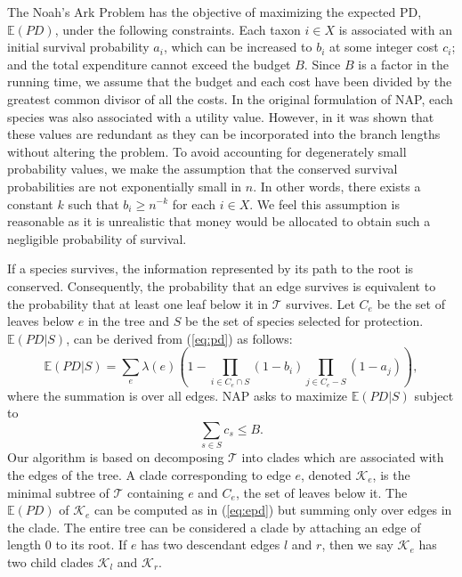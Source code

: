 \documentclass[10pt]{llncs}       \usepackage{graphicx,subfigure}
\begin{document}
The Noah's Ark Problem has the
objective of 
maximizing the expected PD, $\mathbb{E}(PD)$, under the following
constraints.  Each taxon $i \in X$ is associated with an initial survival 
probability $a_i$, which can be increased to $b_i$ at some integer cost $c_i$;
and the total expenditure cannot exceed the budget $B$.  Since $B$ is a 
factor in the running time, we assume that the budget and each cost have been
divided by the greatest common divisor of all the costs. 
In the original
formulation of NAP, each species was also associated with a utility
value. However, 
in \cite{hartmann06} it was shown that
these values are redundant as they can
be incorporated into the branch lengths without altering the problem.
To avoid accounting for degenerately small probability values, we make the
assumption that the conserved survival probabilities are not exponentially
 small in $n$. In
other words, there exists a constant $k$ such that $b_i \geq n^{-k}$ for each
$i \in X$.
We feel this assumption is reasonable as it is unrealistic that money would
be allocated to obtain such a negligible probability of survival.

If a species survives, the information represented by its path to the root
is conserved.  Consequently, the probability that an edge survives is 
equivalent to the probability that at least one leaf below it in 
$\mathcal{T}$ survives.  Let $C_e$ be the set of leaves below $e$ in the
tree and $S$ be the set of species selected for 
protection.  
$\mathbb{E}(PD|S)$, can be derived from 
(\ref{eq:pd})  as follows: 
\begin{equation}
\label{eq:epd}
\mathbb{E}(PD|S) = \sum_e \lambda(e) \left(1 - \prod_{i \in C_e \cap S}
\left(1 - b_i \right) \prod_{j \in C_e - S}
\left(1 - a_j \right) \right),
\end{equation}
where the summation is over all edges. NAP asks to maximize $\mathbb{E}(PD|S)$
subject to
\begin{equation*}
\label{eq:bugetconstraint}
\sum_{s \in S}c_s   \leq B.
\end{equation*}
Our algorithm is based on decomposing $\mathcal{T}$ into clades which are
associated with the edges of the tree. 
A clade corresponding to edge $e$, denoted $\mathcal{K}_e$,
 is the minimal subtree of $\mathcal{T}$
containing $e$ and $C_e$, the set of leaves below it.  The $\mathbb{E}(PD)$ of 
$\mathcal{K}_e$ can be computed
as in (\ref{eq:epd}) but summing only over edges in the clade.  
The entire tree can be considered a clade by
attaching an edge of length 0 to its root.  If $e$ has two 
descendant edges $l$ and $r$,
then we say $\mathcal{K}_e$ has two 
child clades $\mathcal{K}_l$ and $\mathcal{K}_r$. 
\end{document}
